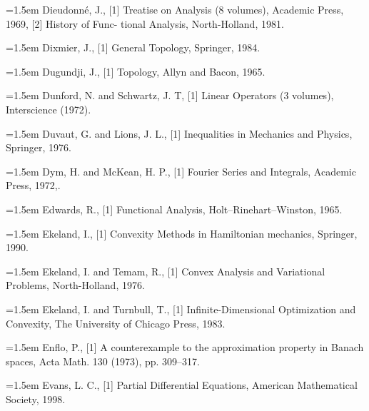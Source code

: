 \noindent\hangindent=1.5em Dieudonné, J., \hypertarget{ref:Dieudonne-1}{[1]} Treatise on Analysis (8 volumes), Academic Press, 1969, \hypertarget{ref:Dieudonne-2}{[2]} History of Func- tional Analysis, North-Holland, 1981.\par{}
\noindent\hangindent=1.5em Dixmier, J., \hypertarget{ref:Dixmier-1}{[1]} General Topology, Springer, 1984.\par{}
\noindent\hangindent=1.5em Dugundji, J., \hypertarget{ref:Dugundji-1}{[1]} Topology, Allyn and Bacon, 1965.\par{}
\noindent\hangindent=1.5em Dunford, N. and Schwartz, J. T, \hypertarget{ref:DunfordSchwartz-1}{[1]} Linear Operators (3 volumes), Interscience (1972).\par{}
\noindent\hangindent=1.5em Duvaut, G. and Lions, J. L., \hypertarget{ref:DuvautLions-1}{[1]} Inequalities in Mechanics and Physics, Springer, 1976.\par{}
\noindent\hangindent=1.5em Dym, H. and McKean, H. P., \hypertarget{ref:DymMcKean-1}{[1]} Fourier Series and Integrals, Academic Press, 1972,.\par{}
\noindent\hangindent=1.5em Edwards, R., \hypertarget{ref:Edwards-1}{[1]} Functional Analysis, Holt--Rinehart--Winston, 1965.\par{}
\noindent\hangindent=1.5em Ekeland, I., \hypertarget{ref:Ekeland-1}{[1]} Convexity Methods in Hamiltonian mechanics, Springer, 1990.\par{}
\noindent\hangindent=1.5em Ekeland, I. and Temam, R., \hypertarget{ref:EkelandTemam-1}{[1]} Convex Analysis and Variational Problems, North-Holland, 1976.\par{}
\noindent\hangindent=1.5em Ekeland, I. and Turnbull, T., \hypertarget{ref:EkelandTurnbull-1}{[1]} Infinite-Dimensional Optimization and Convexity, The University of Chicago Press, 1983.\par{}
\noindent\hangindent=1.5em Enflo, P., \hypertarget{ref:Enflo-1}{[1]} A counterexample to the approximation property in Banach spaces, Acta Math. 130 (1973), pp. 309--317.\par{}
\noindent\hangindent=1.5em Evans, L. C., \hypertarget{ref:Evans-1}{[1]} Partial Differential Equations, American Mathematical Society, 1998.\par{}
